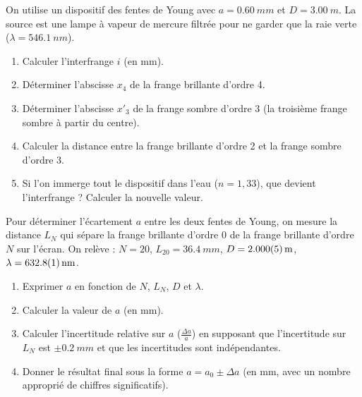 \documentclass[11pt]{article}
\begin{document}
\begin{exercice}
On utilise un dispositif des fentes de Young avec $a = \SI{0,60}{mm}$ et $D = \SI{3,00}{m}$. La source est une lampe à vapeur de mercure filtrée pour ne garder que la raie verte ($\lambda = \SI{546,1}{nm}$).
\begin{enumerate}
    \item Calculer l'interfrange $i$ (en mm).
    \item Déterminer l'abscisse $x_4$ de la frange brillante d'ordre 4.
    \item Déterminer l'abscisse $x'_{3}$ de la frange sombre d'ordre 3 (la troisième frange sombre à partir du centre).
    \item Calculer la distance entre la frange brillante d'ordre 2 et la frange sombre d'ordre 3.
    \item Si l'on immerge tout le dispositif dans l'eau ($n = 1,33$), que devient l'interfrange ? Calculer la nouvelle valeur.
\end{enumerate}
\end{exercice}

\begin{exercice}
Pour déterminer l'écartement $a$ entre les deux fentes de Young, on mesure la distance $L_N$ qui sépare la frange brillante d'ordre 0 de la frange brillante d'ordre $N$ sur l'écran. On relève : $N = 20$, $L_{20} = \SI{36,4}{mm}$, $D = \SI{2,000 \pm 0,005}{m}$, $\lambda = \SI{632,8 \pm 0,1}{nm}$.
\begin{enumerate}
    \item Exprimer $a$ en fonction de $N$, $L_N$, $D$ et $\lambda$.
    \item Calculer la valeur de $a$ (en mm).
    \item Calculer l'incertitude relative sur $a$ ($\frac{\Delta a}{a}$) en supposant que l'incertitude sur $L_N$ est $\pm \SI{0,2}{mm}$ et que les incertitudes sont indépendantes.
    \item Donner le résultat final sous la forme $a = a_0 \pm \Delta a$ (en mm, avec un nombre approprié de chiffres significatifs).
\end{enumerate}
\end{exercice}
\end{document}
